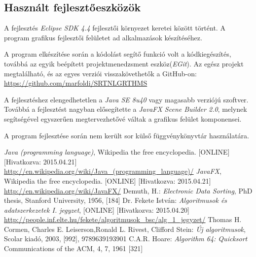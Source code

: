\documentclass{elteikthesis}
\begin{document}
\subsection{Használt fejlesztőeszközök}
A fejlesztés \emph{Eclipse SDK 4.4} fejlesztői környezet keretei között történt. A program grafikus fejlesztői felületet ad alkalmazások készítéséhez.\par
A program elkészítése során a kódolást segítő funkció volt a kódkiegészítés, továbbá az egyik beépített projektmenedzsment eszköz(\emph{EGit}). Az egész projekt megtalálható, és az egyes verziói visszakövethetők a GitHub-on: \url{https://github.com/marfoldi/SRTNLGRTHMS}\par
A fejlesztéshez elengedhetetlen a \emph{Java SE 8u40} vagy magasabb verziójú szoftver. Továbbá a fejlesztést nagyban elősegítette a \emph{JavaFX Scene Builder 2.0}, melynek segítségével egyszerűen megtervezhetővé váltak a grafikus felület komponensei.\par
A program fejlesztése során nem került sor külső függvénykönyvtár használatára.
\begin{thebibliography}{widest entry}
\emph{Java (programming language)},
Wikipedia the free encyclopedia.
[ONLINE] [Hivatkozva: 2015.04.21]
\url{http://en.wikipedia.org/wiki/Java_(programming_language)/}
\emph{JavaFX},
Wikipedia the free encyclopedia.
[ONLINE] [Hivatkozva: 2015.04.21]
\url{http://en.wikipedia.org/wiki/JavaFX/}
Demuth, H.:
\emph{Electronic Data Sorting},
PhD thesis, Stanford University,
1956, [184]
Dr. Fekete István:
\emph{Algoritmusok és adatszerkezetek I. jegyzet},
[ONLINE] [Hivatkozva: 2015.04.20] \url{http://people.inf.elte.hu/fekete/algoritmusok_bsc/alg_1_jegyzet/}
Thomas H. Cormen, Charles E. Leiserson,Ronald L. Rivest, Clifford Stein:
\emph{Új algoritmusok},
Scolar kiadó, 2003,
[992], 9789639193901
C.A.R. Hoare:
\emph{Algorithm 64: Quicksort}
Communications of the ACM, 4, 7, 1961
[321]
\end{thebibliography}
\end{document}
